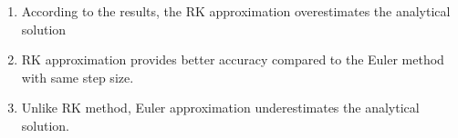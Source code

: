 \documentclass[11pt]{article}
\begin{document}
\begin{enumerate}
\def\labelenumi{\arabic{enumi}.}
\item
  According to the results, the RK approximation overestimates the
  analytical solution
\item
  RK approximation provides better accuracy compared to the Euler method
  with same step size.
\item
  Unlike RK method, Euler approximation underestimates the analytical
  solution.
\end{enumerate}


    
    
    
    
\end{document}
